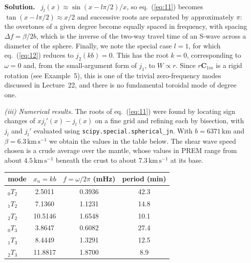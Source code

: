 \documentclass[a4paper,12pt]{paper}
\newenvironment{solution}{\par\noindent\textbf{Solution.}\ }{\par\medskip}
\begin{document}
\begin{solution}
$j_{l}(x)\approx\sin(x-l\pi/2)/x$, so eq.~(\ref{eq:11}) becomes
$\tan(x-l\pi/2)\approx x/2$ and successive roots are separated by approximately $\pi$: the
overtones of a given degree become equally spaced in frequency, with spacing
$\Delta f=\beta/2b$, which is the inverse of the two-way travel time of an S-wave across a
diameter of the sphere. Finally, we note the special case $l=1$, for which eq.~(\ref{eq:12})
reduces to $j_{2}(kb)=0$. This has the root $k=0$, corresponding to $\omega=0$ and, from the
small-argument form of $j_{1}$, to $W\propto r$. Since $r\mathbf{C}_{1m}$ is a rigid rotation
(see Example~5), this is one of the trivial zero-frequency modes discussed in Lecture~22, and
there is no fundamental toroidal mode of degree one.

\medskip
\noindent\textit{(iii) Numerical results.}
The roots of eq.~(\ref{eq:11}) were found by locating sign changes of $xj_{l}'(x)-j_{l}(x)$
on a fine grid and refining each by bisection, with $j_{l}$ and $j_{l}'$ evaluated using
\texttt{scipy.special.spherical\_jn}. With $b=6371\,\mathrm{km}$ and
$\beta=6.3\,\mathrm{km\,s^{-1}}$ we obtain the values in the table below. The shear wave
speed chosen is a crude average over the mantle, whose values in PREM range from about
$4.5\,\mathrm{km\,s^{-1}}$ beneath the crust to about $7.3\,\mathrm{km\,s^{-1}}$ at its base.

\begin{center}
\begin{tabular}{lccc}
\hline
mode & $x_{n}=kb$ & $f=\omega/2\pi$ (mHz) & period (min)\\
\hline
${}_{0}T_{2}$ & 2.5011 & 0.3936 & 42.3\\
${}_{1}T_{2}$ & 7.1360 & 1.1231 & 14.8\\
${}_{2}T_{2}$ & 10.5146 & 1.6548 & 10.1\\
${}_{0}T_{3}$ & 3.8647 & 0.6082 & 27.4\\
${}_{1}T_{3}$ & 8.4449 & 1.3291 & 12.5\\
${}_{2}T_{3}$ & 11.8817 & 1.8700 & 8.9\\
\hline
\end{tabular}
\end{center}


\end{solution}
\end{document}
